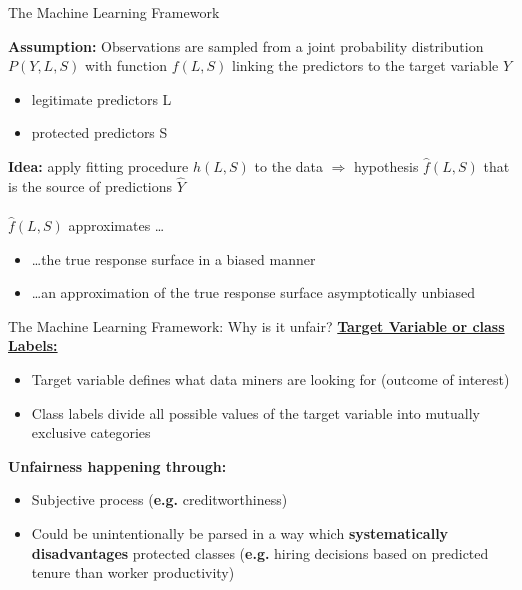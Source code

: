 \begin{frame}{The Machine Learning Framework \cite{Berk.2018}}

    \textbf{Assumption:} Observations are sampled from a joint probability distribution $P(Y, L, S)$ with function $f(L, S)$ linking the predictors to the target variable $Y$
    \begin{itemize}
        \item legitimate predictors L 
        \item protected predictors S
    \end{itemize}
         
    \textbf{Idea:} apply fitting procedure $h(L, S)$ to the data $\Rightarrow$ hypothesis $\hat{f}(L, S)$ that is the source of predictions $\hat{Y}$ \\~\\
    
    $\hat{f}(L, S)$ approximates \dots
    \begin{itemize}
        \item \dots the true response surface in a biased manner
        \item \dots an approximation of the true response surface asymptotically unbiased
    \end{itemize}
\end{frame}

\begin{frame}{The Machine Learning Framework: Why is it unfair? \cite{Barocas.2016, barocas-hardt-narayanan}}
    \underline{\textbf{Target Variable or class Labels:}} \\
    \begin{itemize}
        \item Target variable defines what data miners are looking for (outcome of interest)
        \item Class labels divide all possible values of the target variable into mutually exclusive categories
    \end{itemize}

    \begin{block}{\textbf{Unfairness happening through:}}
    \begin{itemize}
        \item Subjective process (\textbf{e.g.} creditworthiness)
        \item Could be unintentionally be parsed in a way which \textbf{systematically disadvantages} protected classes (\textbf{e.g.} hiring decisions based on predicted tenure than worker productivity)
    \end{itemize}
        \end{block}
\end{frame}

